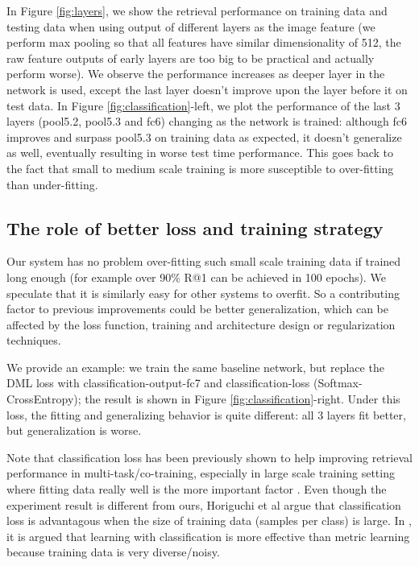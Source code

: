 \documentclass[10pt,twocolumn,letterpaper]{article}
\begin{document}
In Figure \ref{fig:layers}, we show the retrieval performance on training data and testing data when using output of different layers as the image feature (we perform max pooling so that all features have similar dimensionality of 512, the raw feature outputs of early layers are too big to be practical and actually perform worse). We observe the performance increases as deeper layer in the network is used, except the last layer doesn't improve upon the layer before it on test data. In Figure \ref{fig:classification}-left, we plot the performance of the last 3 layers (pool5.2, pool5.3 and fc6) changing as the network is trained: although fc6 improves and surpass pool5.3 on training data as expected, it doesn't generalize as well, eventually resulting in worse test time performance. This goes back to the fact that small to medium scale training is more susceptible to over-fitting than under-fitting.


\subsection{The role of better loss and training strategy}




Our system has no problem over-fitting such small scale training data if trained long enough (for example over 90\% R@1 can be achieved in 100 epochs). We speculate that it is similarly easy for other systems to overfit. So a contributing factor to previous improvements could be better generalization, which can be affected by the loss function, training and architecture design or regularization techniques.

We provide an example: we train the same baseline network, but replace the DML loss with classification-output-fc7 and classification-loss (Softmax-CrossEntropy); the result is shown in Figure \ref{fig:classification}-right. Under this loss, the fitting and generalizing behavior is quite different: all 3 layers fit better, but generalization is worse.

Note that classification loss has been previously shown to help improving retrieval performance in multi-task/co-training, especially in large scale training setting where fitting data really well is the more important factor \cite{Parkhi15, wen2016discriminative}. Even though the experiment result is different from ours, Horiguchi et al \cite{horiguchi2017significance} argue that classification loss is advantagous when the size of training data (samples per class) is large. In \cite{vo2017revisiting}, it is argued that learning with classification is more effective than metric learning because training data is very diverse/noisy.
\end{document}
